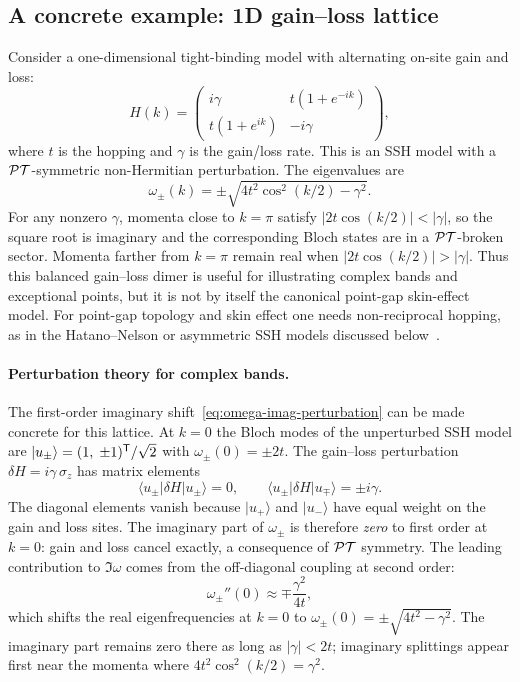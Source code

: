 \subsection{A concrete example: 1D gain--loss lattice}
\label{ssec:1d-example}

Consider a one-dimensional tight-binding model with alternating on-site
gain and loss:
\begin{equation}
 H(k) = \begin{pmatrix} i\gamma & t(1+e^{-ik}) \\
 t(1+e^{ik}) & -i\gamma \end{pmatrix},
 \label{eq:gain-loss-ssh}
\end{equation}
where $t$ is the hopping and $\gamma$ is the gain/loss rate. This is
an SSH model with a $\mathcal{PT}$-symmetric non-Hermitian perturbation. The
eigenvalues are
\begin{equation}
 \omega_\pm(k) = \pm\sqrt{4t^2\cos^2(k/2) - \gamma^2}.
 \label{eq:gl-ssh-eigenvalues}
\end{equation}
For any nonzero $\gamma$, momenta close to $k=\pi$ satisfy
$|2t\cos(k/2)|<|\gamma|$, so the square root is imaginary and the
corresponding Bloch states are in a $\mathcal{PT}$-broken sector. Momenta farther
from $k=\pi$ remain real when $|2t\cos(k/2)|>|\gamma|$. Thus this
balanced gain--loss dimer is useful for illustrating complex bands and
exceptional points, but it is not by itself the canonical point-gap
skin-effect model. For point-gap topology and skin effect one needs
non-reciprocal hopping, as in the Hatano--Nelson or asymmetric SSH
models discussed below~\cite{gong2018topological,shen2017topological}.

\paragraph{Perturbation theory for complex bands.}
The first-order imaginary shift~\eqref{eq:omega-imag-perturbation} can
be made concrete for this lattice. At $k = 0$ the Bloch modes of the
unperturbed SSH model are $|u_\pm\rangle = (1,\;\pm 1)^{\mathsf{T}}/\sqrt{2}$
with $\omega_\pm(0) = \pm 2t$. The gain--loss perturbation
$\delta H = i\gamma\,\sigma_z$ has matrix elements
\begin{equation}
 \langle u_\pm | \delta H | u_\pm \rangle = 0,
 \qquad
 \langle u_\pm | \delta H | u_\mp \rangle = \pm i\gamma.
 \label{eq:gl-ssh-perturbation}
\end{equation}
The diagonal elements vanish because $|u_+\rangle$ and $|u_-\rangle$
have equal weight on the gain and loss sites. The imaginary part of
$\omega_\pm$ is therefore \emph{zero} to first order at $k = 0$:
gain and loss cancel exactly, a consequence of $\mathcal{PT}$ symmetry.
The leading contribution to $\Im\omega$ comes from the off-diagonal
coupling at second order:
\begin{equation}
 \omega_\pm''(0) \approx \mp \frac{\gamma^2}{4t},
 \label{eq:gl-ssh-second-order}
\end{equation}
which shifts the real eigenfrequencies at $k=0$ to
$\omega_\pm(0)=\pm\sqrt{4t^2-\gamma^2}$. The imaginary part remains zero
there as long as $|\gamma|<2t$; imaginary splittings appear first near
the momenta where $4t^2\cos^2(k/2)=\gamma^2$.

